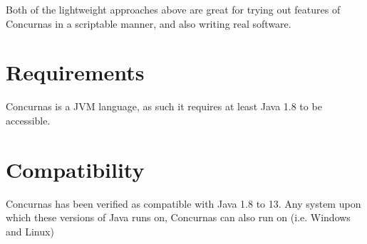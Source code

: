 \documentclass[conc-doc]{subfiles}
\begin{document}
Both of the lightweight approaches above are great for trying out features of Concurnas in a scriptable manner, and also writing real software.


\section{Requirements}
Concurnas is a JVM language, as such it requires at least Java 1.8 to be accessible.

\section{Compatibility}
Concurnas has been verified as compatible with Java 1.8 to 13. Any system upon which these versions of Java runs on,  Concurnas can also run on (i.e. Windows and Linux)
\end{document}
